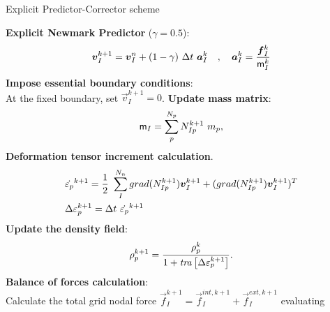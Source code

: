 \begin{algorithm}
  \label{alg:PCE-algorithm}
  \renewcommand{\thealgorithm}{}
  \caption{Explicit Predictor-Corrector scheme}
  \begin{algorithmic}[1]
    \STATE \textbf{Explicit Newmark Predictor} ($\gamma = 0.5$):
    \begin{equation*}
      \vec{v}_I^{k+1} = \vec{v}_I^n + (1 - \gamma)\ \Delta t\ \vec{a}_I^k
      \quad , \quad \vec{a}_I^k = \frac{\vec{f}_{I}^{k}}{\tens{m}_I^k}      
    \end{equation*}
    \STATE \textbf{Impose essential boundary conditions}:\\
    At the fixed boundary, set $\vec{v}_{I}^{k+1} = 0$. 
    \STATE \textbf{Update mass matrix}:
    \begin{equation*}
      \tens{m}_{I} = \sum_{p}^{N_p}N_{Ip}^{k+1}\ m_p,
    \end{equation*}
    \STATE \textbf{Deformation tensor increment calculation}.
    \begin{align*}
      &\dot{\tens{\varepsilon}_{p}}^{k+1} = \frac{1}{2}\ \sum_{I}^{N_n}
        \Grad{N_{Ip}^{k+1}}\vec{v}_{I}^{k+1} +
        (\Grad{N_{Ip}^{k+1}}\vec{v}_{I}^{k+1})^T \\
      &\Delta \tens{\varepsilon}_{p}^{k+1} = \Delta t\ \dot{\tens{\varepsilon}_{p}}^{k+1}
    \end{align*}
    \STATE \textbf{Update the density field}:
    \begin{equation*}
      \rho_p^{k+1} = \frac{\rho_p^k}{1 + \mathit{tra}\left[\Delta\mathsf{\varepsilon}_{p}^{k+1}\right]}.
    \end{equation*}
    \STATE \textbf{Balance of forces calculation}:\\
    Calculate the total grid nodal force $\vec{f}_{I}^{k+1} =
    \vec{f}_{I}^{int,k+1} + \vec{f}_{I}^{ext,k+1}$ evaluating

\end{algorithmic}
\end{algorithm}
